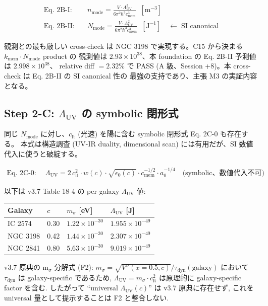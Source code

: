 \documentclass[11pt,a4paper]{ltjsarticle}
\newcommand{\epso}{\epsilon_0}
\newcommand{\kmem}{k_{\mathrm{mem}}}
\newcommand{\cmem}{c_{\mathrm{mem}}}
\newcommand{\Nmode}{N_{\mathrm{mode}}}
\newcommand{\nmode}{n_{\mathrm{mode}}}
\newcommand{\Lambdauv}{\Lambda_{\mathrm{UV}}}
\newcommand{\msigma}{m_{\sigma}}
\newcommand{\clt}{c_{\mathrm{lt}}}       %
\begin{document}
\begin{keybox}
\begin{align*}
\text{Eq. 2B-I:}\quad &\nmode = \frac{V \cdot \Lambdauv^3}{6\pi^2 \hbar^3 \cmem^3}\;\; [\mathrm{m}^{-3}] \\
\text{Eq. 2B-II:}\quad &\Nmode = \frac{V \cdot \Lambdauv^2}{6\pi^2 \hbar^3 \cmem^3}\;\; [\mathrm{J}^{-1}]
\quad \leftarrow\;\text{SI canonical}
\end{align*}
\end{keybox}

観測との最も厳しい cross-check は NGC 3198 で実現する。C15 から決まる $\kmem \cdot \Nmode$ product の
観測値は $2.93 \times 10^{38}$、本 foundation の Eq. 2B-II 予測値は $2.998 \times 10^{38}$、
relative diff $= 2.32\%$ で PASS (A 級、Session +8)。本 cross-check は Eq. 2B-II の SI canonical 性の
最強の支持であり、主張 M3 の実証内容となる。

\subsection{Step 2-C: $\Lambdauv$ の symbolic 閉形式}
同じ $\Nmode$ に対し、$\clt$ (光速) を陽に含む symbolic 閉形式 Eq. 2C-0 も存在する。
本式は構造調査 (UV-IR duality, dimensional scan) には有用だが、SI 数値代入に使うと破綻する。

\begin{keybox}
\begin{align*}
\text{Eq. 2C-0:}\quad &\Lambdauv = 2\,\clt^2 \cdot w(c) \cdot \sqrt{\epso(c)} \cdot \cmem^{-1/2} \cdot a_0^{-1/4}
\quad \text{(symbolic、数値代入不可)}
\end{align*}
\end{keybox}
以下は v3.7 Table 18-4 の per-galaxy $\Lambdauv$ 値:

\begin{center}\small
\begin{tabular}{@{}llll@{}}
\toprule
Galaxy & $c$ & $\msigma$ [eV] & $\Lambdauv$ [J] \\
\midrule
IC 2574  & 0.30 & $1.22 \times 10^{-30}$ & $1.955 \times 10^{-49}$ \\
NGC 3198 & 0.42 & $1.44 \times 10^{-30}$ & $2.307 \times 10^{-49}$ \\
NGC 2841 & 0.80 & $5.63 \times 10^{-30}$ & $9.019 \times 10^{-49}$ \\
\bottomrule
\end{tabular}
\end{center}

v3.7 原典の m$_\sigma$ 分解式 (F2): $\msigma = \sqrt{V''(x=0.5, c)}/\tau_{\mathrm{dyn}}(\mathrm{galaxy})$ において
$\tau_{\mathrm{dyn}}$ は galaxy-specific であるため, $\Lambdauv = \msigma \cdot \clt^2$ は原理的に
galaxy-specific factor を含む. したがって ``universal $\Lambdauv(c)$'' は v3.7 原典に存在せず,
これを universal 量として提示することは F2 と整合しない.
\end{document}
